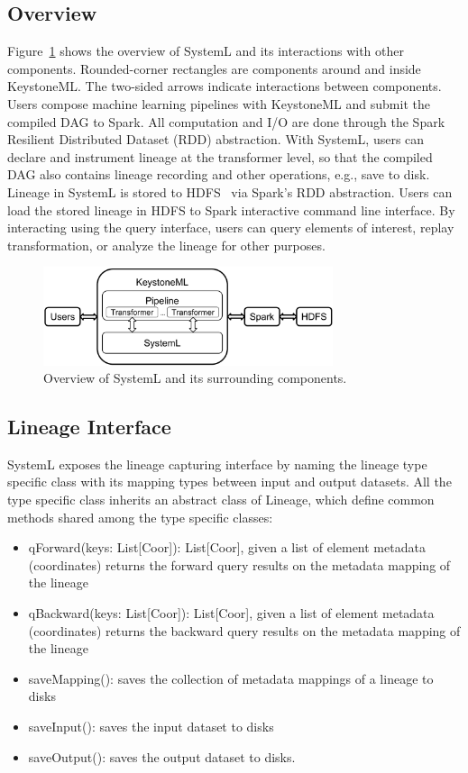 \documentclass{sig-alternate}
\newenvironment{shortlist}{
        \vspace*{-0.5em}
  \begin{itemize}
  \setlength{\itemsep}{-0.1em}
}{
  \end{itemize}
        \vspace*{-0.5em}
}
\begin{document}
\subsection{Overview}
Figure~\ref{fig:architecture} shows the overview of SystemL and its interactions with other components. 
Rounded-corner rectangles are components around and inside KeystoneML. 
The two-sided arrows indicate interactions between components.
Users compose machine learning pipelines with KeystoneML and submit the compiled DAG to Spark.
All computation and I/O are done through the Spark Resilient Distributed Dataset (RDD) abstraction.
With SystemL, users can declare and instrument lineage at the transformer level, 
so that the compiled DAG also contains lineage recording and other operations, e.g., save to disk.
Lineage in SystemL is stored to HDFS~\cite{shvachko10} via Spark's RDD abstraction.
Users can load the stored lineage in HDFS to Spark interactive command line interface.
By interacting using the query interface, users can query elements of interest, replay transformation, or analyze
the lineage for other purposes.

\begin{figure}[h]
\begin{center}
    \includegraphics[width=85mm]{pictures/architecture}
\caption {Overview of SystemL and its surrounding components.
    \label{fig:architecture}
}
\end{center}
\end{figure}

\subsection{Lineage Interface}
\label{sec:Design-Lineage}
SystemL exposes the lineage capturing interface by naming the lineage type specific class with its mapping types between input and output datasets.
All the type specific class inherits an abstract class of Lineage, which define common methods shared among the type specific classes:
\begin{shortlist}
\item{} qForward(keys: List[Coor]): List[Coor], given a list of element metadata (coordinates) returns the forward query results on the metadata mapping of the lineage
\item{} qBackward(keys: List[Coor]): List[Coor], given a list of element metadata (coordinates) returns the backward query results on the metadata mapping of the lineage
\item{} saveMapping(): saves the collection of metadata mappings of a lineage to disks
\item{} saveInput(): saves the input dataset to disks
\item{} saveOutput(): saves the output dataset to disks.
\end{shortlist}
\end{document}
